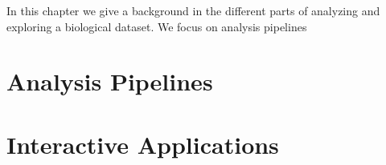 In this chapter we give a background in the different parts of analyzing and
exploring a biological dataset. We focus on analysis pipelines 

\section{Analysis Pipelines}
\section{Interactive Applications} 
